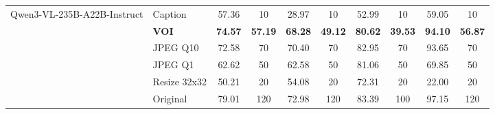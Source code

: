 \begin{table}[p]
{\begin{tabular}{llcccccccc}
\multirow{6}{*}{
Qwen3-VL-235B-A22B-Instruct}
& Caption & 57.36 & 10 & 28.97 & 10 & 52.99 & 10 & 59.05 & 10 \\
& \textbf{VOI} & \textbf{74.57} & \textbf{57.19} & \textbf{68.28} & \textbf{49.12} & \textbf{80.62} & \textbf{39.53} & \textbf{94.10} & \textbf{56.87} \\
& JPEG Q10 & 72.58 & 70 & 70.40 & 70 & 82.95 & 70 & 93.65 & 70 \\
& JPEG Q1 & 62.62 & 50 & 62.58 & 50 & 81.06 & 50 & 69.85 & 50 \\
& Resize 32x32 & 50.21 & 20 & 54.08 & 20 & 72.31 & 20 & 22.00 & 20 \\
& Original & 79.01 & 120 & 72.98 & 120 & 83.39 & 100 & 97.15 & 120 \\
\bottomrule
\end{tabular}
}
\end{table}




